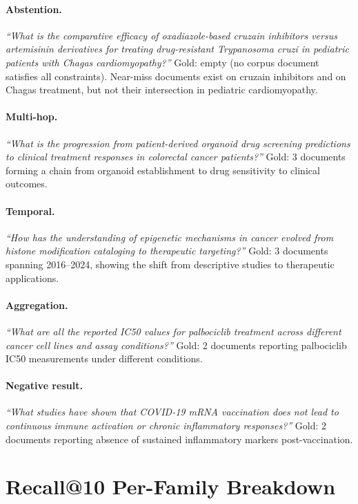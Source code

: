 \documentclass{article}
\begin{document}
\paragraph{Abstention.}
\emph{``What is the comparative efficacy of oxadiazole-based cruzain inhibitors versus artemisinin derivatives for treating drug-resistant Trypanosoma cruzi in pediatric patients with Chagas cardiomyopathy?''}
Gold: empty (no corpus document satisfies all constraints). Near-miss documents exist on cruzain inhibitors and on Chagas treatment, but not their intersection in pediatric cardiomyopathy.

\paragraph{Multi-hop.}
\emph{``What is the progression from patient-derived organoid drug screening predictions to clinical treatment responses in colorectal cancer patients?''}
Gold: 3 documents forming a chain from organoid establishment to drug sensitivity to clinical outcomes.

\paragraph{Temporal.}
\emph{``How has the understanding of epigenetic mechanisms in cancer evolved from histone modification cataloging to therapeutic targeting?''}
Gold: 3 documents spanning 2016--2024, showing the shift from descriptive studies to therapeutic applications.

\paragraph{Aggregation.}
\emph{``What are all the reported IC50 values for palbociclib treatment across different cancer cell lines and assay conditions?''}
Gold: 2 documents reporting palbociclib IC50 measurements under different conditions.

\paragraph{Negative result.}
\emph{``What studies have shown that COVID-19 mRNA vaccination does not lead to continuous immune activation or chronic inflammatory responses?''}
Gold: 2 documents reporting absence of sustained inflammatory markers post-vaccination.

\section{Recall@10 Per-Family Breakdown}
\label{app:perfamily10}
\end{document}
